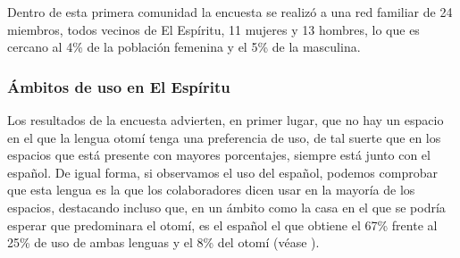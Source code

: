\documentclass[output=paper]{../langscibook}
\begin{document}
Dentro de esta primera comunidad la encuesta se realizó a una red familiar de 24 miembros, todos vecinos de El Espíritu, 11 mujeres y 13 hombres, lo que es cercano al 4\% de la población femenina y el 5\% de la masculina.


 \subsubsection{Ámbitos de uso en El Espíritu}


Los resultados de la encuesta advierten, en primer lugar, que no hay un espacio en el que la lengua otomí tenga una preferencia de uso, de tal suerte que en los espacios que está presente con mayores porcentajes, siempre está junto con el español. De igual forma, si observamos el uso del español, podemos comprobar que esta lengua es la que los colaboradores dicen usar en la mayoría de los espacios, destacando incluso que, en un ámbito como la casa en el que se podría esperar que predominara el otomí, es el español el que obtiene el 67\% frente al 25\% de uso de ambas lenguas y el 8\% del otomí (véase ).
\end{document}
